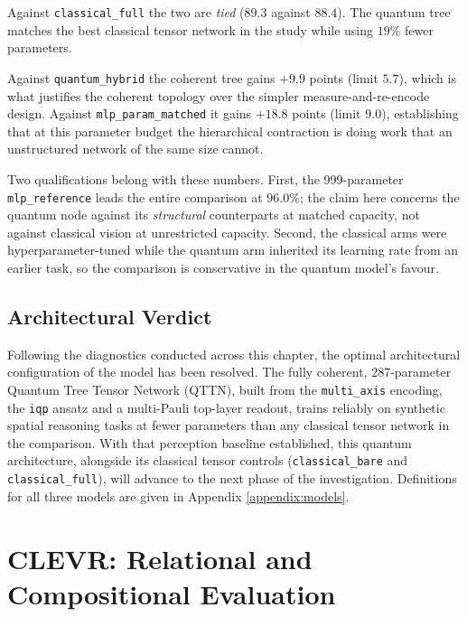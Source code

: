 \documentclass[12pt, a4paper, oneside]{report}
\begin{document}
Against \texttt{classical\_full} the two are \textit{tied} ($89.3$ against $88.4$). The quantum tree matches the best classical tensor network in the study while using $19\%$ fewer parameters.

Against \texttt{quantum\_hybrid} the coherent tree gains $+9.9$ points (limit $5.7$), which is what justifies the coherent topology over the simpler measure-and-re-encode design. Against \texttt{mlp\_param\_matched} it gains $+18.8$ points (limit $9.0$), establishing that at this parameter budget the hierarchical contraction is doing work that an unstructured network of the same size cannot.

Two qualifications belong with these numbers. First, the 999-parameter \texttt{mlp\_reference} leads the entire comparison at $96.0\%$; the claim here concerns the quantum node against its \textit{structural} counterparts at matched capacity, not against classical vision at unrestricted capacity. Second, the classical arms were hyperparameter-tuned while the quantum arm inherited its learning rate from an earlier task, so the comparison is conservative in the quantum model's favour.


\section{Architectural Verdict}

Following the diagnostics conducted across this chapter, the optimal architectural configuration of the model has been resolved.
The fully coherent, 287-parameter Quantum Tree Tensor Network (QTTN), built from the \texttt{multi\_axis} encoding, the \texttt{iqp} ansatz and a multi-Pauli top-layer readout, trains reliably on synthetic spatial reasoning tasks at fewer parameters than any classical tensor network in the comparison.
With that perception baseline established, this quantum architecture, alongside its classical tensor controls (\texttt{classical\_bare} and \texttt{classical\_full}), will advance to the next phase of the investigation. Definitions for all three models are given in Appendix \ref{appendix:models}.



\chapter{CLEVR: Relational and Compositional Evaluation}
\label{ch:clevr}
\end{document}
